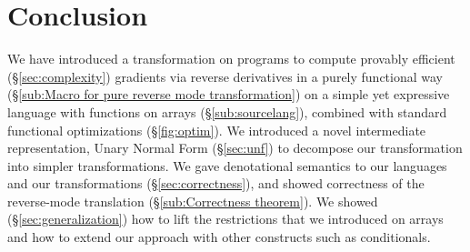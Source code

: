 \section{Conclusion}
\label{sec:conclusion}

We have introduced a transformation on programs to compute provably efficient (\S\ref{sec:complexity}) 
gradients via reverse derivatives in a purely functional way (\S\ref{sub:Macro for pure reverse mode transformation})
on a simple yet expressive language with functions on arrays (\S\ref{sub:sourcelang}), 
combined with standard functional optimizations (\S\ref{fig:optim}).  
We introduced a novel intermediate representation, Unary Normal Form (\S\ref{sec:unf}) 
to decompose our transformation into simpler transformations.
We gave denotational semantics to our languages and our transformations (\S\ref{sec:correctness}), 
and showed correctness of the reverse-mode translation (\S\ref{sub:Correctness theorem}).
We showed (\S\ref{sec:generalization}) how to lift the restrictions that
we introduced on arrays and how to extend our approach with other constructs such as conditionals.
\clearpage